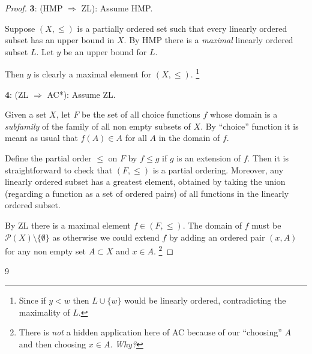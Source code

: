 \documentclass[a4paper]{amsart}
\theoremstyle{plain}
\theoremstyle{definition}
\theoremstyle{remark}
\begin{document}
\begin{proof}
\medskip
\textbf{3}: \noindent (HMP $ \Longrightarrow$  ZL): Assume HMP.  

Suppose $   (X,\leqslant) $ is a partially ordered set such that every linearly ordered subset  has an upper bound in $ X $. By HMP there is a \emph{maximal} linearly ordered subset $ L $.  Let $ y $ be an upper bound for $ L $.

Then $ y $ is clearly a maximal element for $ (X,\leqslant) $.%
\footnote{Since if $y <  w $ then $ L \cup \{w\} $ would be linearly ordered, contradicting the maximality of $ L $.}


\medskip
\textbf{4}: \noindent (ZL $ \Longrightarrow$  AC*): Assume ZL.  

Given a set $ X $, let $ F $ be the set of all choice functions $ f $ whose domain is a \emph{subfamily} of the family of all non empty subsets of $ X $.  By ``choice'' function it is meant as usual that $ f(A)\in A $ for all $ A $ in the domain of $ f $.
 
Define the partial order $ \leqslant $ on $ F $ by $ f \leqslant g $ if $ g $ is an extension of $ f $.  Then it is straightforward to check that $ (F,\leqslant )$ is a partial ordering.  Moreover, any linearly ordered subset has a greatest element, obtained by taking the union (regarding a function as a set of ordered pairs) of all functions in the linearly ordered subset.  

By ZL there is a maximal element   $f \in  (F,\leqslant )$.  The domain of $ f $ must be $ \mathcal{P}(X)\setminus \{\emptyset\} $ as otherwise we could extend $ f $ by adding an ordered pair $ (x,A) $ for any non empty set $ A \subset X $ and $ x \in A $.%
\footnote{There is \emph{not} a hidden application here of AC because of our ``choosing'' $ A $ and then choosing $ x \in A $. \emph{Why?}}
\end{proof} 






\begin{thebibliography}{9} 

	

\end{thebibliography}
\end{document}
